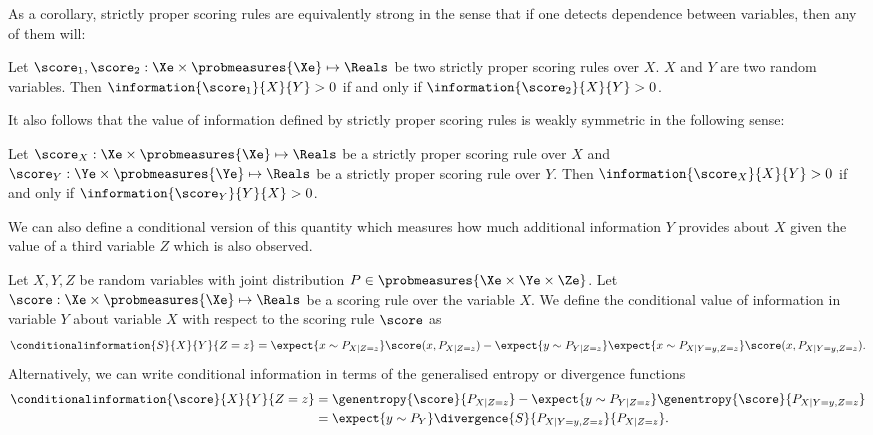 As a corollary, strictly proper scoring rules are equivalently strong in the sense that if one detects dependence between variables, then any of them will:

\begin{corollary}
	Let $\score_1,\score_2:\Xe\times\probmeasures{\Xe}\mapsto\Reals$ be two strictly proper scoring rules over $X$. $X$ and $Y$ are two random variables. Then $\information{\score_1}{X}{Y} > 0$ if and only if $\information{\score_2}{X}{Y} > 0$.
\end{corollary}

It also follows that the value of information defined by strictly proper scoring rules is weakly symmetric in the following sense:

\begin{corollary}
	Let $\score_X:\Xe\times\probmeasures{\Xe}\mapsto\Reals$ be a strictly proper scoring rule over $X$ and $\score_Y:\Ye\times\probmeasures{\Ye}\mapsto\Reals$ be a strictly proper scoring rule over $Y$.  Then $\information{\score_X}{X}{Y} > 0$ if and only if $\information{\score_Y}{Y}{X} > 0$.
\end{corollary}

We can also define a conditional version of this quantity which measures how much additional information $Y$ provides about $X$ given the value of a third variable $Z$ which is also observed.

\begin{definition}
	\label{def:conditional_value_of_information}
	Let $X,Y,Z$ be random variables with joint distribution $P\in\probmeasures{\Xe\times\Ye\times\Ze}$. Let $\score:\Xe\times\probmeasures{\Xe}\mapsto\Reals$ be a scoring rule over the variable $X$. We define the conditional value of information in variable $Y$ about variable $X$ with respect to the scoring rule $\score$ as
	\begin{equation}
		\conditionalinformation{S}{X}{Y}{Z=z} =  \expect{x\sim P_{X\vert Z=z}}\score(x,P_{X\vert Z=z})- \expect{y\sim P_{Y\vert Z=z}} \expect{x\sim P_{X\vert Y=y, Z=z}}\score(x,P_{X\vert Y=y, Z=z}).
	\end{equation}
	Alternatively, we can write conditional information in terms of the generalised entropy or divergence functions
		\begin{align}
			\conditionalinformation{\score}{X}{Y}{Z=z} &=  \genentropy{\score}{P_{X\vert Z=z}} - \expect{y \sim P_{Y \vert Z=z}} \genentropy{\score}{P_{X\vert Y=y, Z=z}}\\
				&= \expect{y\sim P_{Y}}\divergence{S}{P_{X\vert Y=y, Z=z}}{P_{X\vert Z=z}}.
		\end{align}
\end{definition}

